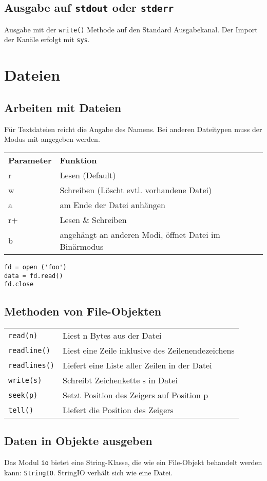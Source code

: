 \subsection{Ausgabe auf \texttt{stdout} oder \texttt{stderr}}
Ausgabe mit der \texttt{write()} Methode auf den Standard Ausgabekanal. Der Import der Kanäle erfolgt mit \texttt{sys}.
\section{Dateien}
\subsection{Arbeiten mit Dateien}
Für Textdateien reicht die Angabe des Namens. Bei anderen Dateitypen muss der Modus mit angegeben werden.\\[0.2em]
\begin{tabular}{ll}
\textbf{Parameter}	&\textbf{Funktion}\\
r	&Lesen (Default)\\
w	&Schreiben (Löscht evtl. vorhandene Datei)\\
a	&am Ende der Datei anhängen\\
r+	&Lesen \& Schreiben\\
b	&angehängt an anderen Modi, öffnet Datei im Binärmodus\\
\end{tabular}
\begin{lstlisting}
fd = open ('foo')
data = fd.read()
fd.close
\end{lstlisting}
\subsection{Methoden von File-Objekten}
\begin{tabular}{ll}
\texttt{read(n)}		&Liest n Bytes aus der Datei\\
\texttt{readline()}	&Liest eine Zeile inklusive des Zeilenendezeichens\\
\texttt{readlines()}	&Liefert eine Liste aller Zeilen in der Datei\\
\texttt{write(s)}		&Schreibt Zeichenkette s in Datei\\
\texttt{seek(p)}		&Setzt Position des Zeigers auf Position p\\
\texttt{tell()}		&Liefert die Position des Zeigers\\
\end{tabular}
\subsection{Daten in Objekte ausgeben}
Das Modul \texttt{io} bietet eine String-Klasse, die wie ein File-Objekt behandelt werden kann: \texttt{StringIO}. StringIO verhält sich wie eine Datei.
